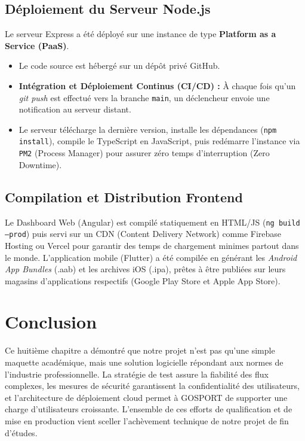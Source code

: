 \subsection{Déploiement du Serveur Node.js}
Le serveur Express a été déployé sur une instance de type \textbf{Platform as a Service (PaaS)}.
\begin{itemize}
    \item Le code source est hébergé sur un dépôt privé GitHub.
    \item \textbf{Intégration et Déploiement Continus (CI/CD) :} À chaque fois qu'un \textit{git push} est effectué vers la branche \texttt{main}, un déclencheur envoie une notification au serveur distant.
    \item Le serveur télécharge la dernière version, installe les dépendances (\texttt{npm install}), compile le TypeScript en JavaScript, puis redémarre l'instance via \texttt{PM2} (Process Manager) pour assurer zéro temps d'interruption (Zero Downtime).
\end{itemize}

\subsection{Compilation et Distribution Frontend}
Le Dashboard Web (Angular) est compilé statiquement en HTML/JS (\texttt{ng build --prod}) puis servi sur un CDN (Content Delivery Network) comme Firebase Hosting ou Vercel pour garantir des temps de chargement minimes partout dans le monde.
L'application mobile (Flutter) a été compilée en générant les \textit{Android App Bundles} (.aab) et les archives iOS (.ipa), prêtes à être publiées sur leurs magasins d'applications respectifs (Google Play Store et Apple App Store).

\section{Conclusion}
Ce huitième chapitre a démontré que notre projet n'est pas qu'une simple maquette académique, mais une solution logicielle répondant aux normes de l'industrie professionnelle. La stratégie de test assure la fiabilité des flux complexes, les mesures de sécurité garantissent la confidentialité des utilisateurs, et l'architecture de déploiement cloud permet à GOSPORT de supporter une charge d'utilisateurs croissante. L'ensemble de ces efforts de qualification et de mise en production vient sceller l'achèvement technique de notre projet de fin d'études.
